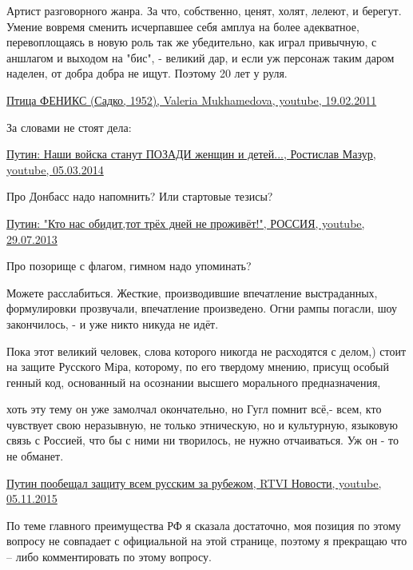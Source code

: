 \begin{itemize}
\begin{itemize}
Артист разговорного жанра. За что, собственно, ценят, холят, лелеют, и берегут.
Умение вовремя сменить исчерпавшее себя амплуа на более адекватное,
перевоплощаясь в новую роль так же убедительно, как играл привычную, с аншлагом
и выходом на "бис", - великий дар, и если уж персонаж таким даром наделен, от
добра добра не ищут. Поэтому 20 лет у руля.

\href{https://www.youtube.com/watch?v=SKMr1XzW2qQ&t=7s}{%
Птица ФЕНИКС (Садко, 1952), Valeria Mukhamedova, youtube, 19.02.2011%
}

За словами не стоят дела:

\href{https://www.youtube.com/watch?v=PoQXvPsBBn8}{%
Путин: Наши войска станут ПОЗАДИ женщин и детей..., Ростислав Мазур, youtube, 05.03.2014%
}

Про Донбасс надо напомнить?
Или стартовые тезисы?

\href{https://www.youtube.com/watch?v=eR_DMRIolSk}{%
Путин: "Кто нас обидит,тот трёх дней не проживёт!", %
РОССИЯ, youtube, 29.07.2013%
}

Про позорище с флагом, гимном надо упоминать?

Можете расслабиться. Жесткие, производившие впечатление выстраданных,
формулировки прозвучали, впечатление произведено.  Огни рампы погасли, шоу
закончилось, - и уже никто никуда не идёт.

Пока этот великий человек, слова которого никогда не расходятся с делом,) стоит
на защите Русского Мiра, которому, по его твердому мнению, присущ особый генный
код, основанный на осознании высшего морального предназначения,

хоть эту тему он уже замолчал окончательно, но Гугл помнит всё,- всем, кто
чувствует свою неразывную, не только этническую, но и культурную, языковую
связь с Россией, что бы с ними ни творилось, не нужно отчаиваться. Уж он - то
не обманет.

\href{https://www.youtube.com/watch?v=_DBIpP_Og1s}{%
Путин пообещал защиту всем русским за рубежом, RTVI Новости, youtube, 05.11.2015%
}

По теме главного преимущества РФ я сказала достаточно, моя позиция по этому
вопросу не совпадает с официальной на этой странице, поэтому я прекращаю что –
либо комментировать по этому вопросу.

 

\end{itemize}
\end{itemize}
